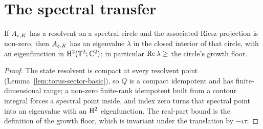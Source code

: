 \section{The spectral transfer}

\begin{lemma}
  \label{lem:transfer:eigenpair-extraction}
  \leanok
  If $A_{\varepsilon,K}$ has a resolvent on a spectral circle and the associated Riesz projection
  is non-zero, then $A_{\varepsilon,K}$ has an eigenvalue $\lambda$ in the closed interior of that
  circle, with an eigenfunction in $\mathrm{H}^2(\mathbb{T}^2;\mathbb{C}^2)$; in particular
  $\operatorname{Re}\lambda\geq$ the circle's growth floor.
\end{lemma}

\begin{proof}
  \leanok
  The state resolvent is compact at every resolvent point
  (Lemma~\ref{lem:torus-sector-basic}), so $Q$ is a compact idempotent and has
  finite-dimensional range; a non-zero finite-rank idempotent built from a contour integral
  forces a spectral point inside, and index zero turns that spectral point into an
  eigenvalue with an $\mathrm{H}^2$ eigenfunction.  The real-part bound is the definition of the
  growth floor, which is invariant under the translation by $-i\tau$.
\end{proof}

